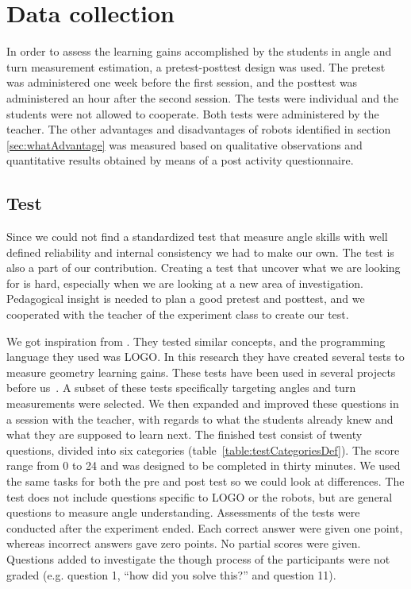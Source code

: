 \section{Data collection}
In order to assess the learning gains accomplished by the students in angle and turn measurement estimation, a pretest-posttest design was used. The pretest was administered one week before the first session, and the posttest was administered an hour after the second session. The tests were individual and the students were not allowed to cooperate. Both tests were administered by the teacher. The other advantages and disadvantages of robots identified in section \ref{sec:whatAdvantage} was measured based on qualitative observations and quantitative results obtained by means of a post activity questionnaire.

\subsection*{Test}
Since we could not find a standardized test that measure angle skills with well defined reliability and internal consistency we had to make our own. The test is also a part of our contribution. Creating a test that uncover what we are looking for is hard, especially when we are looking at a new area of investigation. Pedagogical insight is needed to plan a good pretest and posttest, and we cooperated with the teacher of the experiment class to create our test.

\bigskip\noindent
We got inspiration from \citeauthor{clements2001logo}\cite{clements2001logo}. They tested similar concepts, and the programming language they used was LOGO. In this research they have created several tests to measure geometry learning gains. These tests have been used in several projects before us~\cite{clements1990effects,clements1993research,clements1996development,clements2001logo}. 
A subset of these tests specifically targeting angles and turn measurements were selected.
We then expanded and improved these questions in a session with the teacher, with regards to what the students already knew and what they are supposed to learn next. 
The finished test consist of twenty questions, divided into six categories (table~\ref{table:testCategoriesDef}). The score range from 0 to 24 and was designed to be completed in thirty minutes. We used the same tasks for both the pre and post test so we could look at differences. The test does not include questions specific to LOGO or the robots, but are general questions to measure angle understanding. 
Assessments of the tests were conducted after the experiment ended. Each correct answer were given one point, whereas incorrect answers gave zero points. No partial scores were given. Questions added to investigate the though process of the participants were not graded (e.g. question 1, "`how did you solve this?"' and question 11). 

